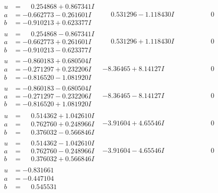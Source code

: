 \documentclass[1p]{elsarticle_modified}
\theoremstyle{definition}
\begin{document}
$$\begin{array}{c|c|c}
\begin{aligned}
u &= \phantom{-}0.254868 + 0.867341 I \\
a &= -0.662773 - 0.261601 I \\
b &= -0.910213 + 0.623377 I\end{aligned}
 & \phantom{-}0.531296 - 1.118430 I & \phantom{-0.000000 } 0 \\ \hline\begin{aligned}
u &= \phantom{-}0.254868 - 0.867341 I \\
a &= -0.662773 + 0.261601 I \\
b &= -0.910213 - 0.623377 I\end{aligned}
 & \phantom{-}0.531296 + 1.118430 I & \phantom{-0.000000 } 0 \\ \hline\begin{aligned}
u &= -0.860183 + 0.680504 I \\
a &= -0.271297 + 0.232206 I \\
b &= -0.816520 - 1.081920 I\end{aligned}
 & -8.36465 + 8.14127 I & \phantom{-0.000000 } 0 \\ \hline\begin{aligned}
u &= -0.860183 - 0.680504 I \\
a &= -0.271297 - 0.232206 I \\
b &= -0.816520 + 1.081920 I\end{aligned}
 & -8.36465 - 8.14127 I & \phantom{-0.000000 } 0 \\ \hline\begin{aligned}
u &= \phantom{-}0.514362 + 1.042610 I \\
a &= \phantom{-}0.762760 + 0.248966 I \\
b &= \phantom{-}0.376032 - 0.566846 I\end{aligned}
 & -3.91604 + 4.65546 I & \phantom{-0.000000 } 0 \\ \hline\begin{aligned}
u &= \phantom{-}0.514362 - 1.042610 I \\
a &= \phantom{-}0.762760 - 0.248966 I \\
b &= \phantom{-}0.376032 + 0.566846 I\end{aligned}
 & -3.91604 - 4.65546 I & \phantom{-0.000000 } 0 \\ \hline\begin{aligned}
u &= -0.831661\phantom{ +0.000000I} \\
a &= -0.447104\phantom{ +0.000000I} \\
b &= \phantom{-}0.545531\phantom{ +0.000000I}\end{aligned}

\end{array}$$
\end{document}

